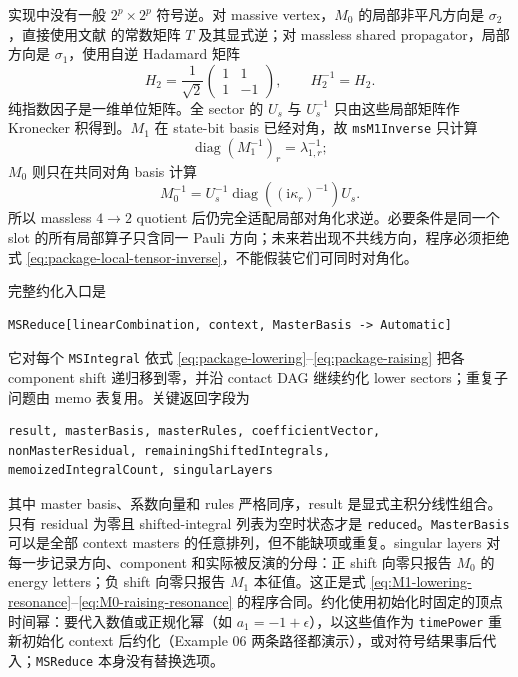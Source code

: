\documentclass[11pt,a4paper]{ctexart}
\newcommand{\ii}{\mathrm i}
\begin{document}
实现中没有一般 $2^p\times2^p$ 符号逆。对 massive vertex，$M_0$ 的局部非平凡方向是 $\sigma_2$，直接使用文献 \cite{Chen:2023eic} 的常数矩阵 $T$ 及其显式逆；对 massless shared propagator，局部方向是 $\sigma_1$，使用自逆 Hadamard 矩阵
\begin{equation}
 H_2=\frac1{\sqrt2}
 \begin{pmatrix}1&1\\1&-1\end{pmatrix},
 \qquad H_2^{-1}=H_2.
 \label{eq:package-hadamard-inverse}
\end{equation}
纯指数因子是一维单位矩阵。全 sector 的 $U_s$ 与 $U_s^{-1}$ 只由这些局部矩阵作 Kronecker 积得到。$M_1$ 在 state-bit basis 已经对角，故 \texttt{msM1Inverse} 只计算
\begin{equation}
 \operatorname{diag}(M_1^{-1})_r=\lambda_{1,r}^{-1};
\end{equation}
$M_0$ 则只在共同对角 basis 计算
\begin{equation}
 M_0^{-1}=U_s^{-1}\operatorname{diag}
 \left((\ii\kappa_r)^{-1}\right)U_s.
 \label{eq:package-local-tensor-inverse}
\end{equation}
所以 massless $4\to2$ quotient 后仍完全适配局部对角化求逆。必要条件是同一个 slot 的所有局部算子只含同一 Pauli 方向；未来若出现不共线方向，程序必须拒绝式 \eqref{eq:package-local-tensor-inverse}，不能假装它们可同时对角化。

完整约化入口是
\begin{verbatim}
MSReduce[linearCombination, context, MasterBasis -> Automatic]
\end{verbatim}
它对每个 \texttt{MSIntegral} 依式 \eqref{eq:package-lowering}--\eqref{eq:package-raising} 把各 component shift 递归移到零，并沿 contact DAG 继续约化 lower sectors；重复子问题由 memo 表复用。关键返回字段为
\begin{verbatim}
result, masterBasis, masterRules, coefficientVector,
nonMasterResidual, remainingShiftedIntegrals,
memoizedIntegralCount, singularLayers
\end{verbatim}
其中 master basis、系数向量和 rules 严格同序，result 是显式主积分线性组合。只有 residual 为零且 shifted-integral 列表为空时状态才是 \texttt{reduced}。\texttt{MasterBasis} 可以是全部 context masters 的任意排列，但不能缺项或重复。singular layers 对每一步记录方向、component 和实际被反演的分母：正 shift 向零只报告 $M_0$ 的 energy letters；负 shift 向零只报告 $M_1$ 本征值。这正是式 \eqref{eq:M1-lowering-resonance}--\eqref{eq:M0-raising-resonance} 的程序合同。约化使用初始化时固定的顶点时间幂：要代入数值或正规化幂（如 $a_1=-1+\epsilon$），以这些值作为 \texttt{timePower} 重新初始化 context 后约化（Example 06 两条路径都演示），或对符号结果事后代入；\texttt{MSReduce} 本身没有替换选项。
\end{document}
